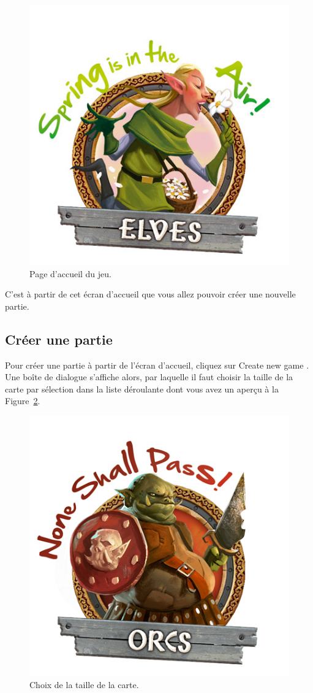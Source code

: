 \begin{figure}
    \centering
    \includegraphics[height=0.70\textwidth]{figure/ecranAccueil.png}
    \caption{Page d'accueil du jeu.}
    \label{fig:ecranAccueil}
\end{figure} 

C'est à partir de cet écran d'accueil que vous allez pouvoir créer une nouvelle partie.

\subsection{Créer une partie}

Pour créer une partie à partir de l'écran d'accueil, cliquez sur \og Create new game \fg{}. Une boîte de dialogue s'affiche alors, par laquelle il faut choisir la taille de la carte par sélection dans la liste déroulante dont vous avez un aperçu à la {\sc Figure}~\ref{fig:sizeMap}. 

\begin{figure}
    \centering
    \includegraphics[height=0.70\textwidth]{figure/sizeMap.png}
    \caption{Choix de la taille de la carte.}
    \label{fig:sizeMap}
\end{figure}

